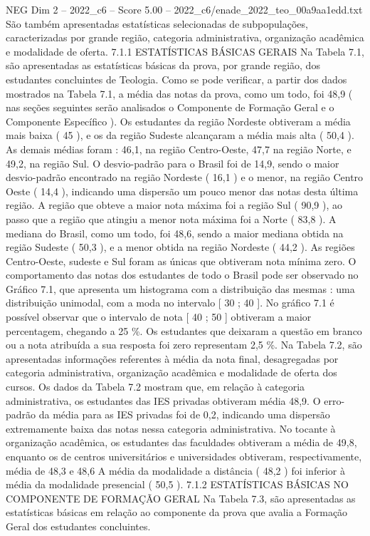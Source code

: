 \begin{textsample}{NEG Dim 2 – 2022\_c6 – Score 5.00 – 2022\_c6/enade\_2022\_teo\_00a9aa1edd.txt}
São também apresentadas estatísticas selecionadas de subpopulações, caracterizadas por grande região, categoria administrativa, organização acadêmica e modalidade de oferta. 7.1.1 ESTATÍSTICAS BÁSICAS GERAIS Na Tabela 7.1, são apresentadas as estatísticas básicas da prova, por grande região, dos estudantes concluintes de Teologia.
Como se pode verificar, a partir dos dados mostrados na Tabela 7.1, a média das notas da prova, como um todo, foi 48,9 ( nas seções seguintes serão analisados o Componente de Formação Geral e o Componente Específico ).
Os estudantes da região Nordeste obtiveram a média mais baixa ( 45 ), e os da região Sudeste alcançaram a média mais alta ( 50,4 ).
As demais médias foram : 46,1, na região Centro-Oeste, 47,7 na região Norte, e 49,2, na região Sul.
O desvio-padrão para o Brasil foi de 14,9, sendo o maior desvio-padrão encontrado na região Nordeste ( 16,1 ) e o menor, na região Centro Oeste ( 14,4 ), indicando uma dispersão um pouco menor das notas desta última região.
A região que obteve a maior nota máxima foi a região Sul ( 90,9 ), ao passo que a região que atingiu a menor nota máxima foi a Norte ( 83,8 ).
A mediana do Brasil, como um todo, foi 48,6, sendo a maior mediana obtida na região Sudeste ( 50,3 ), e a menor obtida na região Nordeste ( 44,2 ).
As regiões Centro-Oeste, sudeste e Sul foram as únicas que obtiveram nota mínima zero.
O comportamento das notas dos estudantes de todo o Brasil pode ser observado no Gráfico 7.1, que apresenta um histograma com a distribuição das mesmas : uma distribuição unimodal, com a moda no intervalo [ 30 ; 40 ].
No gráfico 7.1 é possível observar que o intervalo de nota [ 40 ; 50 ] obtiveram a maior percentagem, chegando a 25 \%.
Os estudantes que deixaram a questão em branco ou a nota atribuída a sua resposta foi zero representam 2,5 \%.
Na Tabela 7.2, são apresentadas informações referentes à média da nota final, desagregadas por categoria administrativa, organização acadêmica e modalidade de oferta dos cursos.
Os dados da Tabela 7.2 mostram que, em relação à categoria administrativa, os estudantes das IES privadas obtiveram média 48,9.
O erro-padrão da média para as IES privadas foi de 0,2, indicando uma dispersão extremamente baixa das notas nessa categoria administrativa.
No tocante à organização acadêmica, os estudantes das faculdades obtiveram a média de 49,8, enquanto os de centros universitários e universidades obtiveram, respectivamente, média de 48,3 e 48,6 A média da modalidade a distância ( 48,2 ) foi inferior à média da modalidade presencial ( 50,5 ). 7.1.2 ESTATÍSTICAS BÁSICAS NO COMPONENTE DE FORMAÇÃO GERAL Na Tabela 7.3, são apresentadas as estatísticas básicas em relação ao componente da prova que avalia a Formação Geral dos estudantes concluintes.

\end{textsample}

